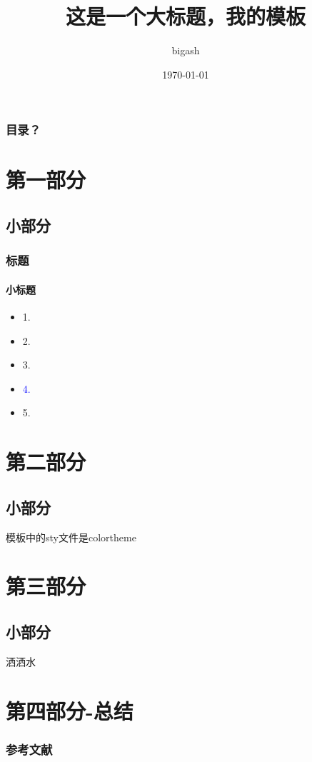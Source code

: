 \documentclass{beamer}
\title[小标题]{这是一个大标题，我的模板}
\author{bigash}
\institute{所属机构}
\date{\today}
\begin{document}
\begin{frame}[plain]
  \titlepage
\end{frame}


\begin{frame}
\frametitle{目录？}
\end{frame}


\section{第一部分}
\subsection{小部分}
\begin{frame}
    \frametitle{标题}
    \framesubtitle{小标题}
    \begin{itemize}
        \item 1.
        \item 2.
        \item 3.
        \item \textcolor{blue}{4.}
        \item 5.
      \end{itemize}
\end{frame}


\section{第二部分}
\subsection{小部分}
\begin{frame}
    模板中的sty文件是colortheme
\end{frame}


\section{第三部分}
\subsection{小部分}
\begin{frame}
    洒洒水
\end{frame}

\section{第四部分-总结}

\begin{frame}[allowframebreaks]
  \frametitle{参考文献}
  \printbibliography[heading=none]
\end{frame}
\end{document}
